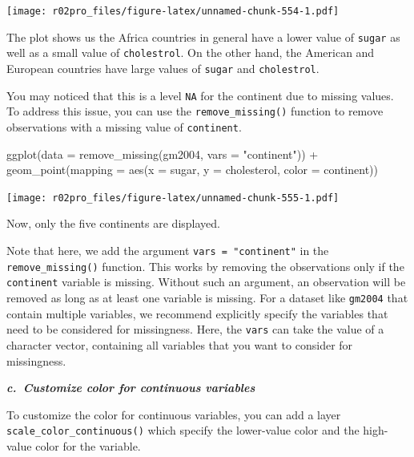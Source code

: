 \documentclass[
]{book}
\newenvironment{Shaded}{\begin{snugshade}}{\end{snugshade}}
\newcommand{\AttributeTok}[1]{\textcolor[rgb]{0.77,0.63,0.00}{#1}}
\newcommand{\FunctionTok}[1]{\textcolor[rgb]{0.00,0.00,0.00}{#1}}
\newcommand{\NormalTok}[1]{#1}
\newcommand{\SpecialCharTok}[1]{\textcolor[rgb]{0.00,0.00,0.00}{#1}}
\newcommand{\StringTok}[1]{\textcolor[rgb]{0.31,0.60,0.02}{#1}}
\newenvironment{blackbox}{
  \definecolor{shadecolor}{rgb}{0, 0, 0}  %
  \color{white}
  \begin{shaded}}
 {\end{shaded}}
\newenvironment{infobox}[1]
  {
  \begin{itemize}
  \renewcommand{\labelitemi}{
    \raisebox{-.7\height}[0pt][0pt]{
      {\setkeys{Gin}{width=3em,keepaspectratio}
        \texttt{[image: pics/\#1]}}
    }
  }
  \setlength{\fboxsep}{1em}
  \begin{blackbox}
  \item
  }
  {
  \end{blackbox}
  \end{itemize}
  }
\begin{document}
\texttt{[image: r02pro\_files/figure-latex/unnamed-chunk-554-1.pdf]}

The plot shows us the Africa countries in general have a lower value of \texttt{sugar} as well as a small value of \texttt{cholestrol}. On the other hand, the American and European countries have large values of \texttt{sugar} and \texttt{cholestrol}.

You may noticed that this is a level \texttt{NA} for the continent due to missing values. To address this issue, you can use the \texttt{remove\_missing()} function to remove observations with a missing value of \texttt{continent}.

\begin{Shaded}
\begin{Highlighting}[]
\FunctionTok{ggplot}\NormalTok{(}\AttributeTok{data =} \FunctionTok{remove\_missing}\NormalTok{(gm2004, }\AttributeTok{vars =} \StringTok{"continent"}\NormalTok{)) }\SpecialCharTok{+} 
  \FunctionTok{geom\_point}\NormalTok{(}\AttributeTok{mapping =} \FunctionTok{aes}\NormalTok{(}\AttributeTok{x =}\NormalTok{ sugar, }
                           \AttributeTok{y =}\NormalTok{ cholesterol,}
                           \AttributeTok{color =}\NormalTok{ continent))}
\end{Highlighting}
\end{Shaded}

\texttt{[image: r02pro\_files/figure-latex/unnamed-chunk-555-1.pdf]}

Now, only the five continents are displayed.

\begin{infobox}{caution}
Note that here, we add the argument \texttt{vars\ =\ "continent"} in the \texttt{remove\_missing()} function. This works by removing the observations only if the \texttt{continent} variable is missing. Without such an argument, an observation will be removed as long as at least one variable is missing. For a dataset like \texttt{gm2004} that contain multiple variables, we recommend explicitly specify the variables that need to be considered for missingness. Here, the \texttt{vars} can take the value of a character vector, containing all variables that you want to consider for missingness.

\end{infobox}

\textbf{\emph{c.~Customize color for continuous variables}}

To customize the color for continuous variables, you can add a layer \texttt{scale\_color\_continuous()} which specify the lower-value color and the high-value color for the variable.
\end{document}

